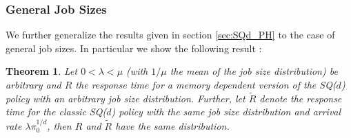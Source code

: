 \documentclass[12pt]{report}
\newtheorem{theorem}{Theorem}
\begin{document}
\subsubsection{General Job Sizes}
We further generalize the results given in section \ref{sec:SQd_PH} to the case of general job sizes. In particular we show the following result :
\begin{theorem} \label{thm:response_SQd_gen}
Let $0<\lambda<\mu$ (with $1/\mu$ the mean of the job size distribution) be arbitrary and $R$ the response time for a memory dependent version of the SQ($d$) policy with an arbitrary job size distribution. Further, let $\tilde R$ denote the response time for the
classic SQ($d$) policy with the same job size distribution and arrival rate $\lambda \pi_0^{1/d}$, then $R$ and $\tilde R$ have the same distribution.
\end{theorem}
\end{document}
